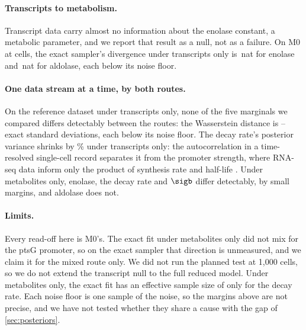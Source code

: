 \paragraph{Transcripts to metabolism.} Transcript data carry almost no information about the
enolase constant, a metabolic parameter, and we report that result as a null, not as a failure.
On M0 at  cells, the exact sampler's divergence under transcripts only is
\,nat for enolase and \,nat for aldolase, each below its noise
floor.

\paragraph{One data stream at a time, by both routes.} On the reference dataset under transcripts only,
none of the five marginals we compared differs detectably between the routes: the
Wasserstein distance is -- exact standard deviations, each
below its noise floor. The decay rate's posterior variance shrinks by \% under transcripts only:
the autocorrelation in a time-resolved single-cell record separates it from the promoter
strength, where RNA-seq data inform only the product of synthesis rate and half-life \cite{karr2015summary}.
Under metabolites only, enolase, the decay rate and $\sigb$
differ detectably, by small margins, and aldolase does not.

\paragraph{Limits.} Every read-off here is M0's. The exact fit under metabolites only did not
mix for the ptsG promoter, so on the exact sampler that direction is unmeasured, and we claim
it for the mixed route only. We did not run the planned test at 1,000 cells, so we do not extend
the transcript null to the full reduced model. Under metabolites only, the exact fit has an
effective sample size of only  for the decay rate. Each noise floor is one
sample of the noise, so the margins above are not precise, and we have not tested whether they
share a cause with the gap of \cref{sec:posteriors}.
